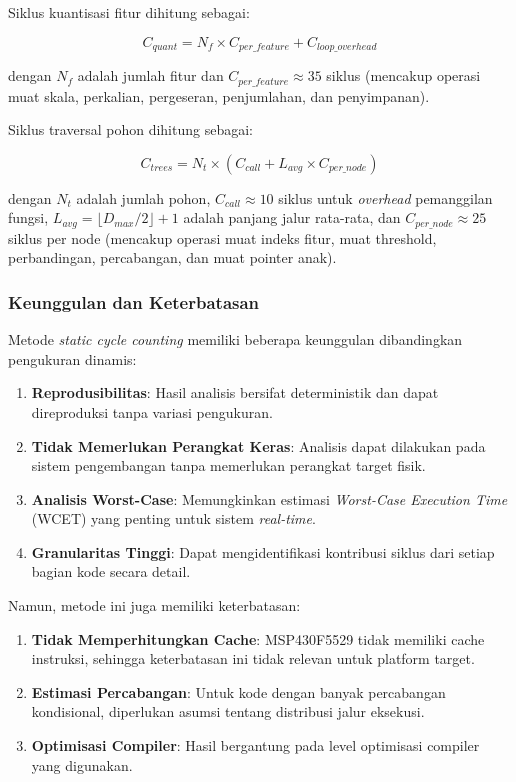 Siklus kuantisasi fitur dihitung sebagai:

\begin{equation}
C_{quant} = N_f \times C_{per\_feature} + C_{loop\_overhead}
\label{eq:quant-cycles}
\end{equation}

\noindent dengan $N_f$ adalah jumlah fitur dan $C_{per\_feature} \approx 35$ siklus (mencakup operasi muat skala, perkalian, pergeseran, penjumlahan, dan penyimpanan).

Siklus traversal pohon dihitung sebagai:

\begin{equation}
C_{trees} = N_t \times (C_{call} + L_{avg} \times C_{per\_node})
\label{eq:tree-cycles}
\end{equation}

\noindent dengan $N_t$ adalah jumlah pohon, $C_{call} \approx 10$ siklus untuk \textit{overhead} pemanggilan fungsi, $L_{avg} = \lfloor D_{max}/2 \rfloor + 1$ adalah panjang jalur rata-rata, dan $C_{per\_node} \approx 25$ siklus per node (mencakup operasi muat indeks fitur, muat threshold, perbandingan, percabangan, dan muat pointer anak).

\subsubsection{Keunggulan dan Keterbatasan}

Metode \textit{static cycle counting} memiliki beberapa keunggulan dibandingkan pengukuran dinamis:

\begin{enumerate}
    \item \textbf{Reprodusibilitas}: Hasil analisis bersifat deterministik dan dapat direproduksi tanpa variasi pengukuran.
    \item \textbf{Tidak Memerlukan Perangkat Keras}: Analisis dapat dilakukan pada sistem pengembangan tanpa memerlukan perangkat target fisik.
    \item \textbf{Analisis Worst-Case}: Memungkinkan estimasi \textit{Worst-Case Execution Time} (WCET) yang penting untuk sistem \textit{real-time}.
    \item \textbf{Granularitas Tinggi}: Dapat mengidentifikasi kontribusi siklus dari setiap bagian kode secara detail.
\end{enumerate}

Namun, metode ini juga memiliki keterbatasan:

\begin{enumerate}
    \item \textbf{Tidak Memperhitungkan Cache}: MSP430F5529 tidak memiliki cache instruksi, sehingga keterbatasan ini tidak relevan untuk platform target.
    \item \textbf{Estimasi Percabangan}: Untuk kode dengan banyak percabangan kondisional, diperlukan asumsi tentang distribusi jalur eksekusi.
    \item \textbf{Optimisasi Compiler}: Hasil bergantung pada level optimisasi compiler yang digunakan.
\end{enumerate}

